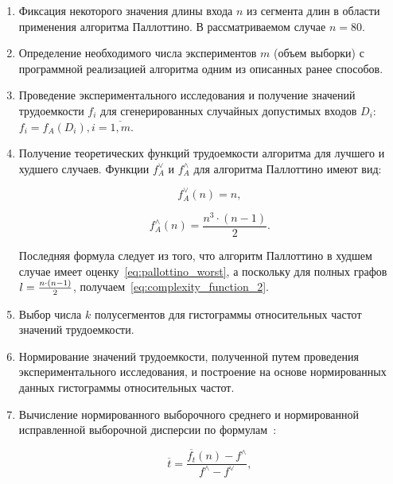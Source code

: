 \documentclass[a4paper, article, 12pt]{extarticle}
\begin{document}
\begin{enumerate}
	\item Фиксация некоторого значения длины входа $n$ из сегмента длин в области применения алгоритма Паллоттино. В рассматриваемом случае $n = 80$.

	\item Определение необходимого числа экспериментов $m$ (объем выборки) с программной реализацией алгоритма одним из описанных ранее способов.

	\item Проведение экспериментального исследования и получение значений трудоемкости $f_i$ для сгенерированных случайных допустимых входов $D_i$: $f_i = f_A(D_i), i = \overline{1, m}$.

	\item Получение теоретических функций трудоемкости алгоритма для лучшего и худшего случаев. Функции $f_A^\vee$ и $f_A^\wedge$ для алгоритма Паллоттино имеют вид:

	\begin{equation}\label{eq:complexity_function_1}
		f_A^\vee(n) = n,
	\end{equation}

	\begin{equation}\label{eq:complexity_function_2}
		f_A^\wedge(n) = \frac{n^3 \cdot (n - 1)}{2}.
	\end{equation}

	Последняя формула следует из того, что алгоритм Паллоттино в худшем случае имеет оценку~\eqref{eq:pallottino_worst}, а поскольку для полных графов\\$l = {n \cdot (n - 1) \over{2}}$, получаем~\eqref{eq:complexity_function_2}.

	\item Выбор числа $k$ полусегментов для гистограммы относительных частот значений трудоемкости.

	\item Нормирование значений трудоемкости, полученной путем проведения экспериментального исследования, и построение на основе нормированных данных гистограммы относительных частот.

	\item Вычисление нормированного выборочного среднего и нормированной исправленной выборочной дисперсии по формулам~\cite{petrushyn_ulyanov_planning}:

	\begin{equation}\label{eq:mean}
		\overline{t} = \frac{\overline{f_t}(n) - f^\wedge}{f^\wedge - f^\vee},
	\end{equation}


\end{enumerate}
\end{document}
